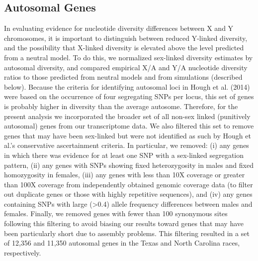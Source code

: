 \documentclass[9pt,twocolumn,twoside]{gsajnl}
\begin{document}
\subsection*{Autosomal Genes}
In evaluating evidence for nucleotide diversity differences between X and Y chromosomes, it is important to distinguish between reduced Y-linked diversity, and the possibility that X-linked diversity is elevated above the level predicted from a neutral model. To do this, we normalized sex-linked diversity estimates by autosomal diversity, and compared empirical X/A and Y/A nucleotide diversity ratios to those predicted from neutral models and from simulations (described below). Because the criteria for identifying autosomal loci in Hough et al. (2014) were based on the occurrence of four segregating SNPs per locus, this set of genes is probably higher in diversity than the average autosome. Therefore, for the present analysis we incorporated the broader set of all non-sex linked (punitively autosomal) genes from our transcriptome data. We also filtered this set to remove genes that may have been sex-linked but were not identified as such by Hough et al.'s conservative ascertainment criteria. In particular, we removed: (i) any genes in which there was evidence for at least one SNP with a sex-linked segregation pattern, (ii) any genes with SNPs showing fixed heterozygosity in males and fixed homozygosity in females, (iii) any genes with less than 10X coverage or greater than 100X coverage from independently obtained genomic coverage data (to filter out duplicate genes or those with highly repetitive sequences), and (iv) any genes containing SNPs with large (>0.4) allele frequency differences between males and females. Finally, we removed genes with fewer than 100 synonymous sites following this filtering to avoid biasing our results toward genes that may have been particularly short due to assembly problems. This filtering resulted in a set of 12,356 and 11,350 autosomal genes in the Texas and North Carolina races, respectively.
\end{document}
